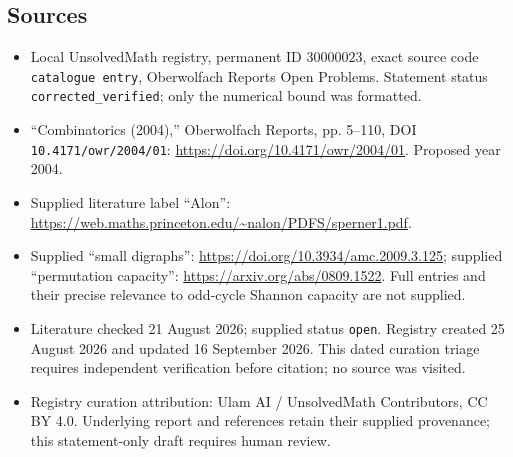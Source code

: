 \documentclass[11pt]{article}
\begin{document}
\subsection{Sources}
\begin{itemize}
\item Local UnsolvedMath registry, permanent ID \(30000023\), exact source code \texttt{catalogue entry}, Oberwolfach Reports Open Problems. Statement status \texttt{corrected\_verified}; only the numerical bound was formatted.
\item ``Combinatorics (2004),'' Oberwolfach Reports, pp. 5--110, DOI \texttt{10.4171/owr/2004/01}: \url{https://doi.org/10.4171/owr/2004/01}. Proposed year 2004.
\item Supplied literature label ``Alon'': \url{https://web.maths.princeton.edu/~nalon/PDFS/sperner1.pdf}.
\item Supplied ``small digraphs'': \url{https://doi.org/10.3934/amc.2009.3.125}; supplied ``permutation capacity'': \url{https://arxiv.org/abs/0809.1522}. Full entries and their precise relevance to odd-cycle Shannon capacity are not supplied.
\item Literature checked 21 August 2026; supplied status \texttt{open}. Registry created 25 August 2026 and updated 16 September 2026. This dated curation triage requires independent verification before citation; no source was visited.
\item Registry curation attribution: Ulam AI / UnsolvedMath Contributors, CC BY 4.0. Underlying report and references retain their supplied provenance; this statement-only draft requires human review.
\end{itemize}
\end{document}
